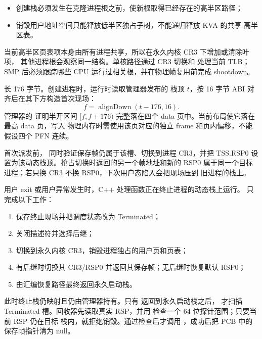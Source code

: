 \begin{itemize}
  \item 创建栈必须发生在克隆进程根之前，使新根取得已经存在的高半区路径；
  \item 销毁用户地址空间只能释放低半区独占子树，不能递归释放 KVA 的共享
        高半区表。
\end{itemize}

当前高半区页表项本身由所有进程共享，所以在永久内核 CR3 下增加或清除叶项，
其他进程根会观察同一结构。单核路径通过 CR3 切换和  处理当前
TLB；SMP 后必须跟踪哪些 CPU 运行过相关根，并在物理帧复用前完成 shootdown。

 长 176 字节。创建进程时，运行时读取管理器发布的
栈顶 \(t\)，按 16 字节 ABI 对齐后在其下方构造首次现场：
\[
  f=\operatorname{alignDown}(t-176,16).
\]
管理器的  证明半开区间
\([f,f+176)\) 完整落在四个 data 页中。当前布局使它落在最高 data 页，写入
物理内存时需使用该页对应的独立 frame 和页内偏移，不能假设四个 PFN 连续。

首次派发前， 同时验证保存帧仍属于该槽、切换到进程
CR3，并把 TSS.RSP0 设置为该动态栈顶。抢占切换时返回的另一个帧地址和新的
RSP0 属于同一个目标进程；若只换 CR3 不换 RSP0，下次用户态陷入会把现场压到
旧进程的栈上。

用户 exit 或用户异常发生时，C++ 处理函数正在终止进程的动态栈上运行。
 只完成以下工作：

\begin{enumerate}[label=\arabic*.]
  \item 保存终止现场并把调度状态改为 Terminated；
  \item 关闭描述符并选择后继；
  \item 切换到永久内核 CR3，销毁进程独占的用户页和页表；
  \item 有后继时切换其 CR3/RSP0 并返回其保存帧；无后继时恢复默认 RSP0；
  \item 由汇编恢复路径最终返回永久启动栈。
\end{enumerate}

此时终止栈仍映射且仍由管理器持有。只有
 返回到永久启动栈之后，
 才扫描 Terminated 槽。回收器先读取真实
RSP，并用  检查一个 64 位探针范围；只要当前 RSP 仍在目标
栈内，就拒绝销毁。通过检查后才调用 ，成功后把 PCB 中的
保存帧指针清为 null。

